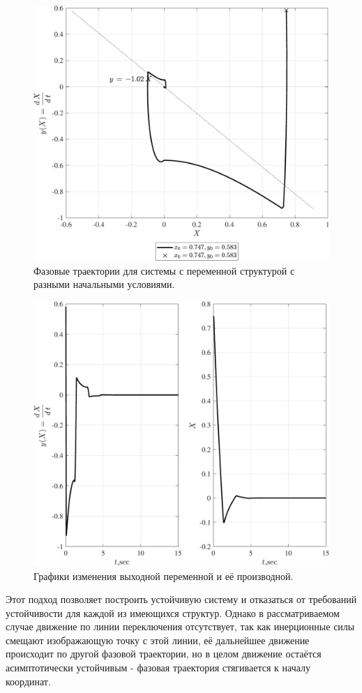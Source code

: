 \begin{figure}[!h]\centering
\includegraphics[width=1.0\linewidth]{images/VSS_steady_degenerate_motion_ft_SDM}
\caption{ Фазовые траектории для системы с переменной структурой с разными начальными условиями.}\label{fig:VSS_steady_degenerate_motion_ft_SDM}
\end{figure}
\begin{figure}[!h]\centering
\includegraphics[width=1.0\linewidth]{images/VSS_steady_degenerate_motion_sv_SDM}
\caption{ Графики изменения выходной переменной и её производной.}\label{fig:VSS_steady_degenerate_motion_sv_SDM}
\end{figure}

Этот подход позволяет построить устойчивую систему и отказаться от требований устойчивости для каждой из имеющихся структур. Однако в рассматриваемом случае движение по линии переключения отсутствует, так как инерционные силы смещают изображающую точку с этой линии, её дальнейшее движение происходит по другой фазовой траектории, но в целом движение остаётся асимптотически устойчивым - фазовая траектория стягивается к началу координат. 
